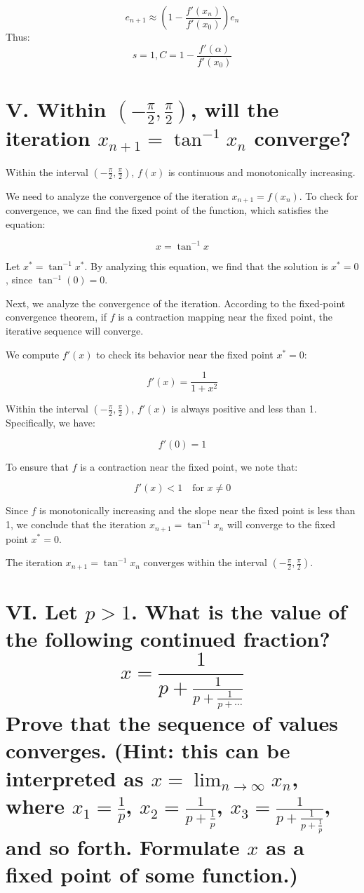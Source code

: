 \documentclass[a4paper]{article}
\begin{document}
\[ e_{n+1} \approx (1-\frac{f'(x_n)}{f'(x_0)})e_n\]
Thus:
\[s = 1, C =  1-\frac{f'(\alpha)}{f'(x_0)}\]

\section*{V. Within $\left(-\frac{\pi}{2}, \frac{\pi}{2}\right)$, will the iteration $x_{n+1} = \tan^{-1}x_n$ converge?}

Within the interval \(\left(-\frac{\pi}{2}, \frac{\pi}{2}\right)\), \(f(x)\) is continuous and monotonically increasing.

We need to analyze the convergence of the iteration \(x_{n+1} = f(x_n)\). To check for convergence, we can find the fixed point of the function, which satisfies the equation:

\[x = \tan^{-1} x\]

Let \(x^* = \tan^{-1} x^*\). By analyzing this equation, we find that the solution is \(x^* = 0\), since \(\tan^{-1}(0) = 0\).

Next, we analyze the convergence of the iteration. According to the fixed-point convergence theorem, if \(f\) is a contraction mapping near the fixed point, the iterative sequence will converge.

We compute \(f'(x)\) to check its behavior near the fixed point \(x^* = 0\):

\[f'(x) = \frac{1}{1+x^2}\]

Within the interval \(\left(-\frac{\pi}{2}, \frac{\pi}{2}\right)\), \(f'(x)\) is always positive and less than 1. Specifically, we have:

\[f'(0) = 1\]

To ensure that \(f\) is a contraction near the fixed point, we note that:

\[f'(x) < 1 \quad \text{for } x \neq 0\]

Since \(f\) is monotonically increasing and the slope near the fixed point is less than 1, we conclude that the iteration \(x_{n+1} = \tan^{-1} x_n\) will converge to the fixed point \(x^* = 0\).

The iteration \(x_{n+1} = \tan^{-1} x_n\) converges within the interval \(\left(-\frac{\pi}{2}, \frac{\pi}{2}\right)\).

\section*{VI. Let \( p > 1 \). What is the value of the following continued fraction?
\[x = \frac{1}{p + \frac{1}{p + \frac{1}{p + \cdots}}}\]
Prove that the sequence of values converges. (Hint: this can be interpreted as \( x = \lim_{n \to \infty} x_n \), where \( x_1 = \frac{1}{p} \), \( x_2 = \frac{1}{p + \frac{1}{p}} \), \( x_3 = \frac{1}{p + \frac{1}{p + \frac{1}{p}}} \), and so forth. Formulate \( x \) as a fixed point of some function.)}
\end{document}

